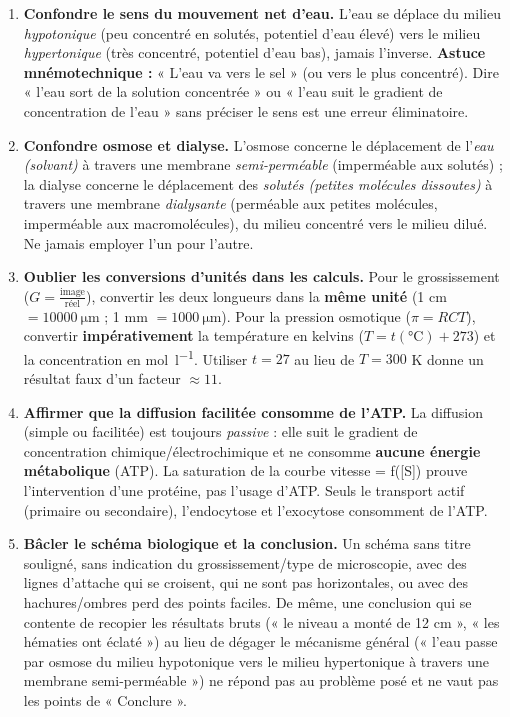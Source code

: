 \documentclass[11pt]{article}
\newcommand{\cle}[1]{{\popxbold\color{popdark}#1}}
\begin{document}
\begin{attention}
\begin{enumerate}
\item \textbf{Confondre le sens du mouvement net d'eau.} L'eau se déplace du milieu \emph{hypotonique} (peu concentré en solutés, potentiel d'eau élevé) vers le milieu \emph{hypertonique} (très concentré, potentiel d'eau bas), jamais l'inverse. \textbf{Astuce mnémotechnique :} « L'eau va vers le sel » (ou vers le plus concentré). Dire « l'eau sort de la solution concentrée » ou « l'eau suit le gradient de concentration de l'eau » sans préciser le sens est une erreur éliminatoire.
\item \textbf{Confondre osmose et dialyse.} L'\cle{osmose} concerne le déplacement de l'\emph{eau (solvant)} à travers une membrane \emph{semi-perméable} (imperméable aux solutés) ; la \cle{dialyse} concerne le déplacement des \emph{solutés (petites molécules dissoutes)} à travers une membrane \emph{dialysante} (perméable aux petites molécules, imperméable aux macromolécules), du milieu concentré vers le milieu dilué. Ne jamais employer l'un pour l'autre.
\item \textbf{Oublier les conversions d'unités dans les calculs.} Pour le grossissement ($G = \frac{\text{image}}{\text{réel}}$), convertir les deux longueurs dans la \textbf{même unité} (1 cm $= \SI{10000}{\micro\metre}$ ; 1 mm $= \SI{1000}{\micro\metre}$). Pour la pression osmotique ($\pi = R C T$), convertir \textbf{impérativement} la température en kelvins ($T = t(°\text{C}) + 273$) et la concentration en \si{mol\per\litre}. Utiliser $t = 27$ au lieu de $T = 300$ K donne un résultat faux d'un facteur $\approx 11$.
\item \textbf{Affirmer que la diffusion facilitée consomme de l'ATP.} La diffusion (simple ou facilitée) est toujours \emph{passive} : elle suit le gradient de concentration chimique/électrochimique et ne consomme \textbf{aucune énergie métabolique} (ATP). La saturation de la courbe vitesse = f([S]) prouve l'intervention d'une protéine, pas l'usage d'ATP. Seuls le transport actif (primaire ou secondaire), l'endocytose et l'exocytose consomment de l'ATP.
\item \textbf{Bâcler le schéma biologique et la conclusion.} Un schéma sans titre souligné, sans indication du grossissement/type de microscopie, avec des lignes d'attache qui se croisent, qui ne sont pas horizontales, ou avec des hachures/ombres perd des points faciles. De même, une conclusion qui se contente de recopier les résultats bruts (« le niveau a monté de 12 cm », « les hématies ont éclaté ») au lieu de dégager le mécanisme général (« l'eau passe par osmose du milieu hypotonique vers le milieu hypertonique à travers une membrane semi-perméable ») ne répond pas au problème posé et ne vaut pas les points de « Conclure ».
\end{enumerate}
\end{attention}
\end{document}
